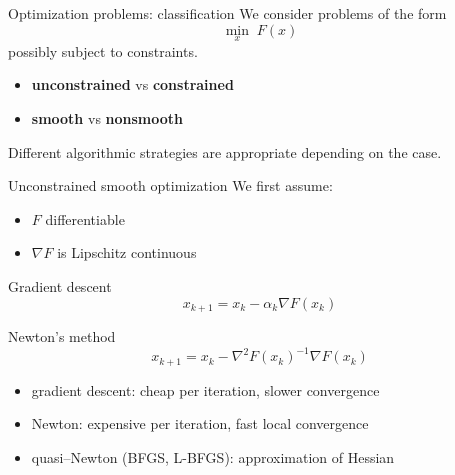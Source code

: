 \documentclass[aspectratio=169]{beamer}
\begin{document}
\begin{frame}{Optimization problems: classification}
We consider problems of the form
\[
\min_{x} \; F(x)
\]
possibly subject to constraints.
\pause
\begin{itemize}
    \item \textbf{unconstrained} vs \textbf{constrained}
    \item \textbf{smooth} vs \textbf{nonsmooth}
\end{itemize}

Different algorithmic strategies are appropriate depending on the case.
\end{frame}


\begin{frame}{Unconstrained smooth optimization}
We first assume:
\begin{itemize}
    \item $F$ differentiable
    \item $\nabla F$ is Lipschitz continuous
\end{itemize}
\pause
\begin{block}{Gradient descent}
\[
x_{k+1} = x_k - \alpha_k \nabla F(x_k)
\]
\end{block}
\pause
\begin{block}{Newton’s method}
\[
x_{k+1} = x_k - \nabla^2 F(x_k)^{-1}\nabla F(x_k)
\]
\end{block}

\begin{itemize}
    \item gradient descent: cheap per iteration, slower convergence
    \item Newton: expensive per iteration, fast local convergence
    \item quasi–Newton (BFGS, L-BFGS): approximation of Hessian
\end{itemize}
\end{frame}

\end{document}
